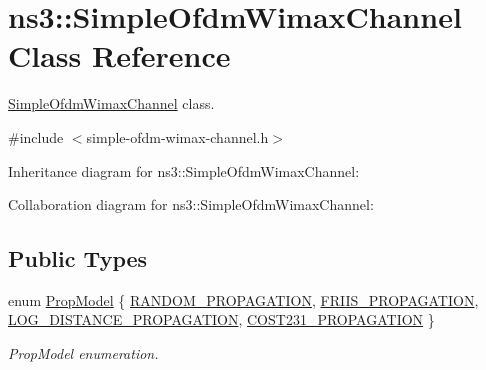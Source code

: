 \hypertarget{classns3_1_1SimpleOfdmWimaxChannel}{}\section{ns3\+:\+:Simple\+Ofdm\+Wimax\+Channel Class Reference}
\label{classns3_1_1SimpleOfdmWimaxChannel}


\hyperlink{classns3_1_1SimpleOfdmWimaxChannel}{Simple\+Ofdm\+Wimax\+Channel} class.  




{\ttfamily \#include $<$simple-\/ofdm-\/wimax-\/channel.\+h$>$}



Inheritance diagram for ns3\+:\+:Simple\+Ofdm\+Wimax\+Channel\+:


Collaboration diagram for ns3\+:\+:Simple\+Ofdm\+Wimax\+Channel\+:
\subsection*{Public Types}
\begin{DoxyCompactItemize}
\item 
enum \hyperlink{classns3_1_1SimpleOfdmWimaxChannel_ad8299e6adf4848b1cf213df963e94842}{Prop\+Model} \{ \hyperlink{classns3_1_1SimpleOfdmWimaxChannel_ad8299e6adf4848b1cf213df963e94842a5e9e492c176e43488bc29bc8b81115a3}{R\+A\+N\+D\+O\+M\+\_\+\+P\+R\+O\+P\+A\+G\+A\+T\+I\+ON}, 
\hyperlink{classns3_1_1SimpleOfdmWimaxChannel_ad8299e6adf4848b1cf213df963e94842a3a15cb0de31fe3061af5cb809f52356b}{F\+R\+I\+I\+S\+\_\+\+P\+R\+O\+P\+A\+G\+A\+T\+I\+ON}, 
\hyperlink{classns3_1_1SimpleOfdmWimaxChannel_ad8299e6adf4848b1cf213df963e94842a95e3aed3c123d1be9fa29d40bb47cef3}{L\+O\+G\+\_\+\+D\+I\+S\+T\+A\+N\+C\+E\+\_\+\+P\+R\+O\+P\+A\+G\+A\+T\+I\+ON}, 
\hyperlink{classns3_1_1SimpleOfdmWimaxChannel_ad8299e6adf4848b1cf213df963e94842a3a47ef0ca6f1074cceda8963d4b11a63}{C\+O\+S\+T231\+\_\+\+P\+R\+O\+P\+A\+G\+A\+T\+I\+ON}
 \}\begin{DoxyCompactList}\small\item\em Prop\+Model enumeration. \end{DoxyCompactList}
\end{DoxyCompactItemize}
